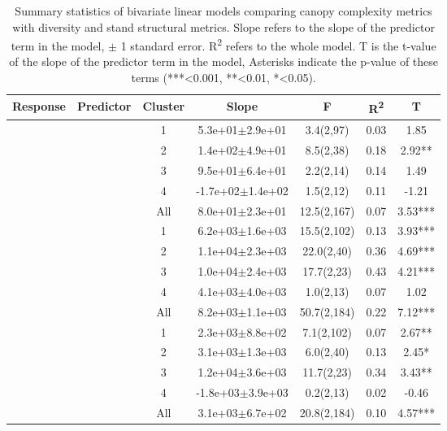 \setlength{\tabcolsep}{4pt}
\begin{longtable}{llccccS[table-format=-2.2, table-space-text-post = {***}]}
\caption{Summary statistics of bivariate linear models comparing canopy complexity metrics with diversity and stand structural metrics. Slope refers to the slope of the predictor term in the model, $\pm{}$ 1 standard error. R\textsuperscript{2} refers to the whole model. T is the t-value of the slope of the predictor term in the model, Asterisks indicate the p-value of these terms (***<0.001, **<0.01, *<0.05).} \\ 
  \toprule
{Response} & {Predictor} & {Cluster} & {Slope} & {F} & {R\textsuperscript{2}} & {T} \\ 
  \midrule
{} & {} & 1 &  5.3e+01$\pm$2.9e+01 & 3.4(2,97) & 0.03 & 1.85 \\ 
   &  & 2 &  1.4e+02$\pm$4.9e+01 & 8.5(2,38) & 0.18 & 2.92** \\ 
   &  & 3 &  9.5e+01$\pm$6.4e+01 & 2.2(2,14) & 0.14 & 1.49 \\ 
   &  & 4 & -1.7e+02$\pm$1.4e+02 & 1.5(2,12) & 0.11 & -1.21 \\ 
   &  & All &  8.0e+01$\pm$2.3e+01 & 12.5(2,167) & 0.07 & 3.53*** \\ 
   \midrule
{} & {} & 1 &  6.2e+03$\pm$1.6e+03 & 15.5(2,102) & 0.13 & 3.93*** \\ 
   &  & 2 &  1.1e+04$\pm$2.3e+03 & 22.0(2,40) & 0.36 & 4.69*** \\ 
   &  & 3 &  1.0e+04$\pm$2.4e+03 & 17.7(2,23) & 0.43 & 4.21*** \\ 
   &  & 4 &  4.1e+03$\pm$4.0e+03 & 1.0(2,13) & 0.07 & 1.02 \\ 
   &  & All &  8.2e+03$\pm$1.1e+03 & 50.7(2,184) & 0.22 & 7.12*** \\ 
   \midrule
{} & {} & 1 &  2.3e+03$\pm$8.8e+02 & 7.1(2,102) & 0.07 & 2.67** \\ 
   &  & 2 &  3.1e+03$\pm$1.3e+03 & 6.0(2,40) & 0.13 & 2.45* \\ 
   &  & 3 &  1.2e+04$\pm$3.6e+03 & 11.7(2,23) & 0.34 & 3.43** \\ 
   &  & 4 & -1.8e+03$\pm$3.9e+03 & 0.2(2,13) & 0.02 & -0.46 \\ 
   &  & All &  3.1e+03$\pm$6.7e+02 & 20.8(2,184) & 0.10 & 4.57*** \\ 

\end{longtable}
